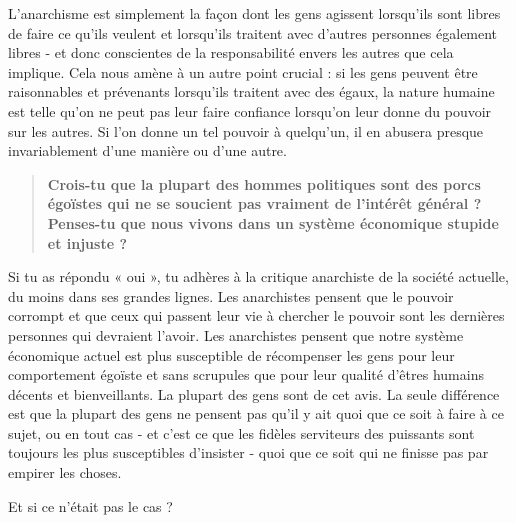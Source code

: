 L'anarchisme est simplement la façon dont les gens agissent lorsqu'ils sont libres de faire ce qu'ils veulent et lorsqu'ils traitent avec d'autres personnes également libres - et donc conscientes de la responsabilité envers les autres que cela implique. Cela nous amène à un autre point crucial : si les gens peuvent être raisonnables et prévenants lorsqu'ils traitent avec des égaux, la nature humaine est telle qu'on ne peut pas leur faire confiance lorsqu'on leur donne du pouvoir sur les autres. Si l'on donne un tel pouvoir à quelqu'un, il en abusera presque invariablement d'une manière ou d'une autre.

\begin{quotation}
\textbf{Crois-tu que la plupart des hommes politiques sont des porcs égoïstes qui ne se soucient pas vraiment de l'intérêt général ? Penses-tu que nous vivons dans un système économique stupide et injuste ?}
\end{quotation}

Si tu as répondu « oui », tu adhères à la critique anarchiste de la société actuelle, du moins dans ses grandes lignes. Les anarchistes pensent que le pouvoir corrompt et que ceux qui passent leur vie à chercher le pouvoir sont les dernières personnes qui devraient l'avoir. Les anarchistes pensent que notre système économique actuel est plus susceptible de récompenser les gens pour leur comportement égoïste et sans scrupules que pour leur qualité d'êtres humains décents et bienveillants. La plupart des gens sont de cet avis. La seule différence est que la plupart des gens ne pensent pas qu'il y ait quoi que ce soit à faire à ce sujet, ou en tout cas - et c'est ce que les fidèles serviteurs des puissants sont toujours les plus susceptibles d'insister - quoi que ce soit qui ne finisse pas par empirer les choses.

Et si ce n'était pas le cas ?

